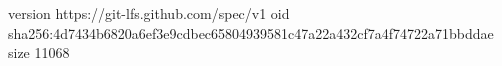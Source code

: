 version https://git-lfs.github.com/spec/v1
oid sha256:4d7434b6820a6ef3e9cdbec65804939581c47a22a432cf7a4f74722a71bbddae
size 11068
